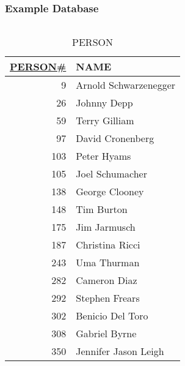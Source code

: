 \documentclass[dvipsnames]{beamer}
\theoremstyle{plain}
\begin{document}
\begin{frame}
  \frametitle{Example Database}

  \begin{columns}[b]
    \begin{tiny}
    \begin{table}
      \caption{PERSON}
      \begin{tabular}{|r|l|}\hline
\underline{PERSON\#} & NAME\\[2pt]\hline\hline
   9 & Arnold Schwarzenegger\\\hline
  26 & Johnny Depp          \\\hline
  59 & Terry Gilliam        \\\hline
  97 & David Cronenberg     \\\hline
 103 & Peter Hyams          \\\hline
 105 & Joel Schumacher      \\\hline
 138 & George Clooney       \\\hline
 148 & Tim Burton           \\\hline
 175 & Jim Jarmusch         \\\hline
 187 & Christina Ricci      \\\hline
 243 & Uma Thurman          \\\hline
 282 & Cameron Diaz         \\\hline
 292 & Stephen Frears       \\\hline
 302 & Benicio Del Toro     \\\hline
 308 & Gabriel Byrne        \\\hline
 350 & Jennifer Jason Leigh \\\hline
      \end{tabular}
    \end{table}
    \end{tiny}


\end{columns}
\end{frame}
\end{document}
